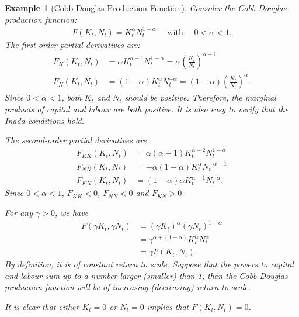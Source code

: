 \documentclass{book}
\newtheorem{example}{Example}[chapter]
\theoremstyle{definition}
\theoremstyle{plain}
\begin{document}
\begin{example}[Cobb-Douglas Production Function]\label{eg:cd_prod_func}
    Consider the Cobb-Douglas production function:
    \begin{align} \label{eq:cd_prod_func}
        F(K_t, N_t) = K_t^{\alpha} N_t^{1-\alpha} \quad \text{ with } \quad 0 < \alpha < 1.
    \end{align}
    The first-order partial derivatives are:
    \begin{align*}
        F_K(K_t, N_t) &= \alpha K_t^{\alpha-1} N_t^{1-\alpha} = \alpha \left(\frac{K_t}{N_t}\right)^{\alpha-1} \\
        F_N(K_t, N_t) &= (1-\alpha) K_t^{\alpha} N_t^{-\alpha} = (1-\alpha) \left(\frac{K_t}{N_t}\right)^{\alpha}.
    \end{align*}
    Since $0<\alpha<1$, both $K_t$ and $N_t$ should be positive. Therefore, the marginal products of capital and labour are both positive. It is also easy to verify that the Inada conditions hold.

    The second-order partial derivatives are
    \begin{align*}
        F_{KK}(K_t, N_t) &= \alpha(\alpha-1) K_t^{\alpha-2} N_t^{1-\alpha}\\
        F_{NN}(K_t, N_t) &= -\alpha(1-\alpha) K_t^{\alpha} N_t^{-\alpha-1}\\
        F_{KN}(K_t, N_t) &= (1-\alpha)\alpha K_t^{\alpha-1} N_t^{-\alpha}.
    \end{align*}
    Since $0<\alpha<1$, $F_{KK}<0$, $F_{NN}<0$ and $F_{KN}>0$.

    For any $\gamma > 0$, we have
    \begin{align*}
        F(\gamma K_t, \gamma N_t) &= (\gamma K_t)^{\alpha} (\gamma N_t)^{1-\alpha}\\
        &= \gamma^{\alpha + (1-\alpha)} K_t^{\alpha} N_t^{\alpha}\\
        &= \gamma F(K_t, N_t).
    \end{align*}
    By definition, it is of constant return to scale. Suppose that the powers to capital and labour sum up to a number larger (smaller) than 1, then the Cobb-Douglas production function will be of increasing (decreasing) return to scale.

    It is clear that either $K_t = 0$ or $N_t = 0$ implies that $F(K_t, N_t) = 0$.
\end{example}
\end{document}
